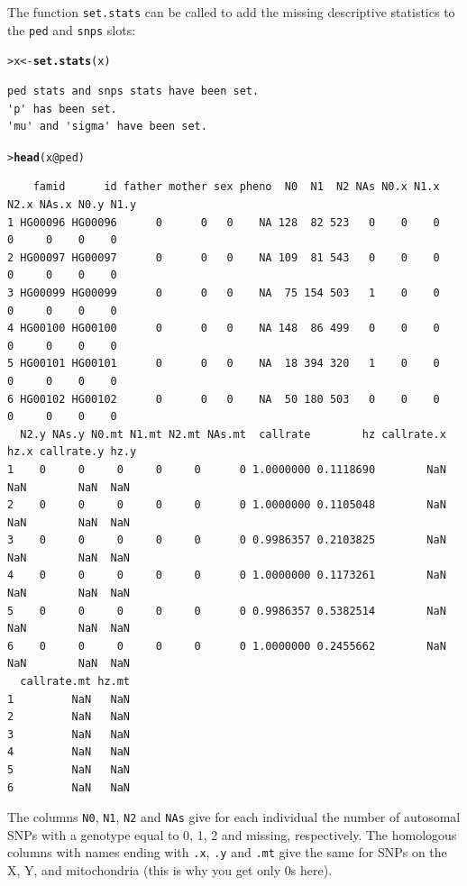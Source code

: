 \documentclass{article}\usepackage[]{graphicx}\usepackage[]{color}
\makeatletter
\newcommand{\hlopt}[1]{\textcolor[rgb]{0,0,0}{#1}}%
\newcommand{\hlstd}[1]{\textcolor[rgb]{0.345,0.345,0.345}{#1}}%
\newcommand{\hlkwb}[1]{\textcolor[rgb]{0.69,0.353,0.396}{#1}}%
\newcommand{\hlkwc}[1]{\textcolor[rgb]{0.333,0.667,0.333}{#1}}%
\newcommand{\hlkwd}[1]{\textcolor[rgb]{0.737,0.353,0.396}{\textbf{#1}}}%
\newenvironment{kframe}{%
 \def\at@end@of@kframe{}%
 \ifinner\ifhmode%
  \def\at@end@of@kframe{\end{minipage}}%
  \begin{minipage}{\columnwidth}%
 \fi\fi%
 \def\FrameCommand##1{\hskip\@totalleftmargin \hskip-\fboxsep
 \colorbox{shadecolor}{##1}\hskip-\fboxsep
     \hskip-\linewidth \hskip-\@totalleftmargin \hskip\columnwidth}%
 \MakeFramed {\advance\hsize-\width
   \@totalleftmargin\z@ \linewidth\hsize
   \@setminipage}}%
 {\par\unskip\endMakeFramed%
 \at@end@of@kframe}
\newenvironment{knitrout}{}{} %
\makeatother
\begin{document}
  The function \verb!set.stats! can be called to add the missing descriptive statistics to the \verb!ped! 
  and \verb!snps! slots:
\begin{knitrout}
\color{fgcolor}\begin{kframe}
\begin{alltt}
\hlstd{> }\hlstd{x} \hlkwb{<-} \hlkwd{set.stats}\hlstd{(x)}
\end{alltt}
\begin{verbatim}
ped stats and snps stats have been set. 
'p' has been set. 
'mu' and 'sigma' have been set.
\end{verbatim}
\begin{alltt}
\hlstd{> }\hlkwd{head}\hlstd{(x}\hlopt{@}\hlkwc{ped}\hlstd{)}
\end{alltt}
\begin{verbatim}
    famid      id father mother sex pheno  N0  N1  N2 NAs N0.x N1.x N2.x NAs.x N0.y N1.y
1 HG00096 HG00096      0      0   0    NA 128  82 523   0    0    0    0     0    0    0
2 HG00097 HG00097      0      0   0    NA 109  81 543   0    0    0    0     0    0    0
3 HG00099 HG00099      0      0   0    NA  75 154 503   1    0    0    0     0    0    0
4 HG00100 HG00100      0      0   0    NA 148  86 499   0    0    0    0     0    0    0
5 HG00101 HG00101      0      0   0    NA  18 394 320   1    0    0    0     0    0    0
6 HG00102 HG00102      0      0   0    NA  50 180 503   0    0    0    0     0    0    0
  N2.y NAs.y N0.mt N1.mt N2.mt NAs.mt  callrate        hz callrate.x hz.x callrate.y hz.y
1    0     0     0     0     0      0 1.0000000 0.1118690        NaN  NaN        NaN  NaN
2    0     0     0     0     0      0 1.0000000 0.1105048        NaN  NaN        NaN  NaN
3    0     0     0     0     0      0 0.9986357 0.2103825        NaN  NaN        NaN  NaN
4    0     0     0     0     0      0 1.0000000 0.1173261        NaN  NaN        NaN  NaN
5    0     0     0     0     0      0 0.9986357 0.5382514        NaN  NaN        NaN  NaN
6    0     0     0     0     0      0 1.0000000 0.2455662        NaN  NaN        NaN  NaN
  callrate.mt hz.mt
1         NaN   NaN
2         NaN   NaN
3         NaN   NaN
4         NaN   NaN
5         NaN   NaN
6         NaN   NaN
\end{verbatim}
\end{kframe}
\end{knitrout}

The columns \verb!N0!, \verb!N1!, \verb!N2! and \verb!NAs! give for each individual the number of
autosomal SNPs with a genotype equal to 0, 1, 2 and missing, respectively. The homologous columns
with names ending with \verb!.x!, \verb!.y! and \verb!.mt! give the same for SNPs on the X, Y, and mitochondria
(this is why you get only 0s here).
\end{document}
